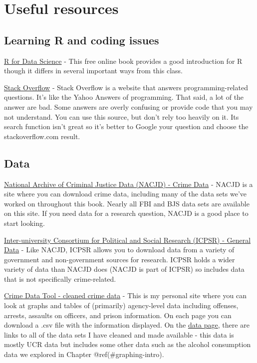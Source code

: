 \documentclass[
  12pt,
]{book}
\begin{document}
\cleardoublepage

\hypertarget{appendix-appendix}{%
\appendix}


\hypertarget{useful-resources}{%
\chapter{Useful resources}\label{useful-resources}}

\hypertarget{learning-r-and-coding-issues}{%
\section{Learning R and coding issues}\label{learning-r-and-coding-issues}}

\href{http://r4ds.had.co.nz/}{R for Data Science} - This free online book provides a good introduction for R though it differs in several important ways from this class.

\href{http://stackoverflow.com/}{Stack Overflow} - Stack Overflow is a website that answers programming-related questions. It's like the Yahoo Answers of programming. That said, a lot of the answer are bad. Some answers are overly confusing or provide code that you may not understand. You can use this source, but don't rely too heavily on it. Its search function isn't great so it's better to Google your question and choose the stackoverflow.com result.

\hypertarget{data}{%
\section{Data}\label{data}}

\href{https://www.icpsr.umich.edu/icpsrweb/content/NACJD/index.html}{National Archive of Criminal Justice Data (NACJD) - Crime Data} - NACJD is a site where you can download crime data, including many of the data sets we've worked on throughout this book. Nearly all FBI and BJS data sets are available on this site. If you need data for a research question, NACJD is a good place to start looking.

\href{https://www.icpsr.umich.edu/icpsrweb/}{Inter-university Consortium for Political and Social Research (ICPSR) - General Data} - Like NACJD, ICPSR allows you to download data from a variety of government and non-government sources for research. ICPSR holds a wider variety of data than NACJD does (NACJD is part of ICPSR) so includes data that is not specifically crime-related.

\href{http://jacobdkaplan.com/data}{Crime Data Tool - cleaned crime data} - This is my personal site where you can look at graphs and tables of (primarily) agency-level data including offenses, arrests, assaults on officers, and prison information. On each page you can download a .csv file with the information displayed. On the \href{http://jacobdkaplan.com/data.html}{data page}, there are links to all of the data sets I have cleaned and made available - this data is mostly UCR data but includes some other data such as the alcohol consumption data we explored in Chapter @ref(\#graphing-intro).
\end{document}

